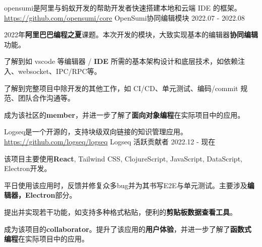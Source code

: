 

\begin{cventries}


    \cventry
    {opensumi是阿里与蚂蚁开发的帮助开发者快速搭建本地和云端 IDE 的框架。\href{https://github.com/opensumi/core}{https://github.com/opensumi/core}} %
    {OpenSumi协同编辑模块} %
    {} %
    {2022.07 - 2022.08} %
    {
        \begin{cvitems} %
            \item {2022年\textbf{阿里巴巴编程之夏}课题。本次开发的模块，大致实现基本的编辑器\textbf{协同编辑}功能。}
            \item {了解到如 vscode 等编辑器 / \textbf{IDE} 所需的基本架构设计和底层技术，如依赖注入、websocket、IPC/RPC等。}
            \item {了解到完整项目中除开发的其他工作，如 CI/CD、单元测试、编码/commit 规范、团队合作沟通等。}
            \item {成为该社区的\textbf{member}，并进一步了解了\textbf{面向对象编程}在实际项目中的应用。}
        \end{cvitems}
    }


    \cventry
    {Logseq是一个开源的，支持块级双向链接的知识管理应用。\href{https://github.com/logseq/logseq}{https://github.com/logseq/logseq}} %
    {Logseq 活跃贡献者} %
    {} %
    {2022.12 - 现在} %
    {
        \begin{cvitems} %
            \item {该项目主要使用\textbf{React}, Tailwind CSS, ClojureScript, JavaScript, DataScript, Electron开发。}
            \item {平日使用该应用时，反馈并修复众多bug并为其书写E2E与单元测试。主要涉及\textbf{编辑器，Electron}部分。}
            \item {提出并实现若干功能，如支持多种格式粘贴，便利的\textbf{剪贴板数据查看工具}。}
            \item {成为该项目的\textbf{collaborator}。提升了该应用的\textbf{用户体验}，并进一步了解了\textbf{函数式编程}在实际项目中的应用。}
        \end{cvitems}
    }

\end{cventries}
